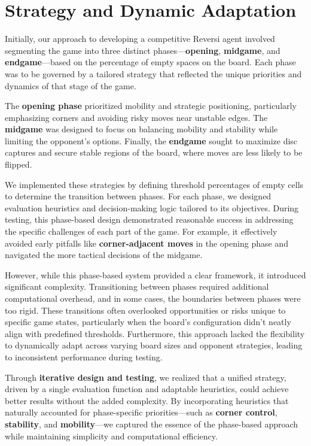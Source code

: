 \documentclass[11pt]{article}
\begin{document}
\section*{ Strategy and Dynamic Adaptation}
Initially, our approach to developing a competitive Reversi agent involved segmenting the game into three distinct phases—\textbf{opening}, \textbf{midgame}, and \textbf{endgame}—based on the percentage of empty spaces on the board. Each phase was to be governed by a tailored strategy that reflected the unique priorities and dynamics of that stage of the game. 

\noindent The \textbf{opening phase} prioritized mobility and strategic positioning, particularly emphasizing corners and avoiding risky moves near unstable edges. The \textbf{midgame} was designed to focus on balancing mobility and stability while limiting the opponent's options. Finally, the \textbf{endgame} sought to maximize disc captures and secure stable regions of the board, where moves are less likely to be flipped.

\noindent We implemented these strategies by defining threshold percentages of empty cells to determine the transition between phases. For each phase, we designed evaluation heuristics and decision-making logic tailored to its objectives. During testing, this phase-based design demonstrated reasonable success in addressing the specific challenges of each part of the game. For example, it effectively avoided early pitfalls like \textbf{corner-adjacent moves} in the opening phase and navigated the more tactical decisions of the midgame.

\noindent However, while this phase-based system provided a clear framework, it introduced significant complexity. Transitioning between phases required additional computational overhead, and in some cases, the boundaries between phases were too rigid. These transitions often overlooked opportunities or risks unique to specific game states, particularly when the board’s configuration didn't neatly align with predefined thresholds. Furthermore, this approach lacked the flexibility to dynamically adapt across varying board sizes and opponent strategies, leading to inconsistent performance during testing.

\noindent Through \textbf{iterative design and testing}, we realized that a unified strategy, driven by a single evaluation function and adaptable heuristics, could achieve better results without the added complexity. By incorporating heuristics that naturally accounted for phase-specific priorities—such as \textbf{corner control}, \textbf{stability}, and \textbf{mobility}—we captured the essence of the phase-based approach while maintaining simplicity and computational efficiency. 
\end{document}
